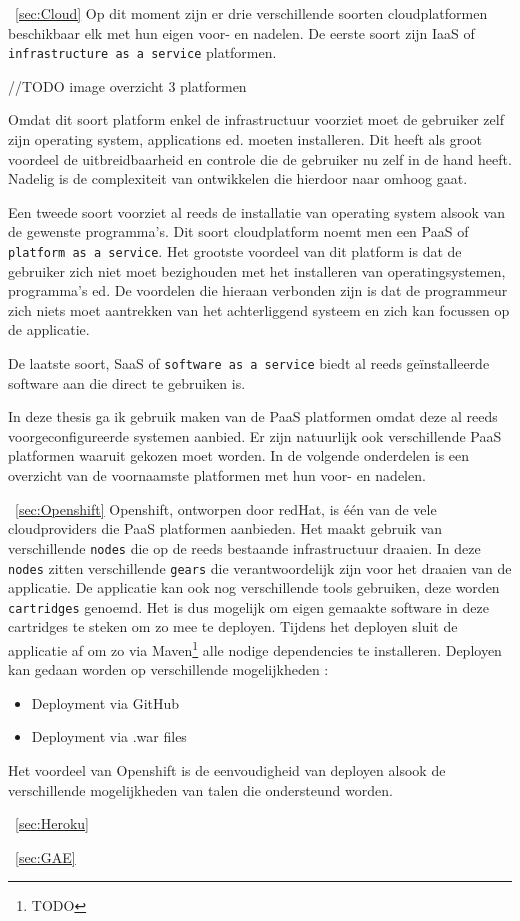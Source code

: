 ~\ref{sec:Cloud}
Op dit moment zijn er drie verschillende soorten cloudplatformen beschikbaar elk met hun eigen voor- en nadelen.
De eerste soort zijn IaaS of \texttt{infrastructure as a service} platformen.

//TODO image overzicht 3 platformen

Omdat dit soort platform enkel de infrastructuur voorziet moet de gebruiker zelf zijn operating system, applications ed. moeten installeren.
Dit heeft als groot voordeel de uitbreidbaarheid en controle die de gebruiker nu zelf in de hand heeft.
Nadelig is de complexiteit van ontwikkelen die hierdoor naar omhoog gaat.\newline

Een tweede soort voorziet al reeds de installatie van operating system alsook van de gewenste programma's.
Dit soort cloudplatform noemt men een PaaS of \texttt{platform as a service}.
Het grootste voordeel van dit platform is dat de gebruiker zich niet moet bezighouden met het installeren van operatingsystemen, programma's ed.
De voordelen die hieraan verbonden zijn is dat de programmeur zich niets moet aantrekken van het achterliggend systeem en zich kan focussen op de applicatie.

De laatste soort, SaaS of \texttt{software as a service} biedt al reeds geïnstalleerde software aan die direct te gebruiken is.

In deze thesis ga ik gebruik maken van de PaaS platformen omdat deze al reeds voorgeconfigureerde systemen aanbied.
Er zijn natuurlijk ook verschillende PaaS platformen waaruit gekozen moet worden.
In de volgende onderdelen is een overzicht van de voornaamste platformen met hun voor- en nadelen.


~\ref{sec:Openshift}
Openshift, ontworpen door redHat, is één van de vele cloudproviders die PaaS platformen aanbieden.
Het maakt gebruik van verschillende \texttt{nodes} die op de reeds bestaande infrastructuur draaien.
In deze \texttt{nodes} zitten verschillende \texttt{gears} die verantwoordelijk zijn voor het draaien van de applicatie.
De applicatie kan ook nog verschillende tools gebruiken, deze worden \texttt{cartridges} genoemd.
Het is dus mogelijk om eigen gemaakte software in deze cartridges te steken om zo mee te deployen.
Tijdens het deployen sluit de applicatie af om zo via Maven\footnote{TODO} alle nodige dependencies te installeren.
Deployen kan gedaan worden op verschillende mogelijkheden :
\begin{itemize}
	\item Deployment via GitHub
	\item Deployment via .war files
\end{itemize}
Het voordeel van Openshift is de eenvoudigheid van deployen alsook de verschillende mogelijkheden van talen die ondersteund worden.

~\ref{sec:Heroku}

~\ref{sec:GAE}